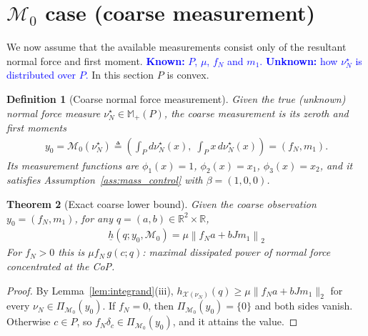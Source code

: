 \documentclass[11pt,a4paper]{article}
\theoremstyle{plain}
\newtheorem{theorem}{Theorem}[section]
\newtheorem{definition}[theorem]{Definition}
\newcommand{\X}{\mathcal X}
\begin{document}
\section{$\mathcal{M}_0$ case (coarse measurement)}
\label{sec:M0}

We now assume that the available measurements consist only of the resultant normal force and first moment.
\textcolor{blue}{\textbf{Known:} $P$, $\mu$, $f_N$ and $m_1$. \textbf{Unknown:} how $\nu_N^\star$ is distributed over $P$.}
In this section $P$ is convex. 

\begin{definition}[Coarse normal force measurement]\label{def:coarse_measurement}
    Given the true (unknown) normal force measure $\nu_N^\star\in\mathbb M_+(P)$,
    the coarse measurement is its zeroth and first moments
    \begin{align}
    y_0 = \mathcal M_0(\nu_N^\star) \triangleq \left(\int_P d\nu_N^\star(x),\;\int_P x\,d\nu_N^\star(x)\right) = (f_N,m_1).
    \end{align}
    Its measurement functions are $\phi_1(x)=1$, $\phi_2(x)=x_1$, $\phi_3(x)=x_2$, and it satisfies Assumption~\ref{ass:mass_control} with $\beta=(1,0,0)$.
\end{definition}

\begin{theorem}[Exact coarse lower bound]
\label{thm:coarse_lower}
    Given the coarse observation $y_0=(f_N,m_1)$, for any $q=(a,b)\in\mathbb R^2\times\mathbb R$,
    \begin{align}
            \boxed{\underline h(q;y_0,\mathcal M_0) = \mu \left\|f_Na+bJm_1\right\|_2}
    \end{align}
    For $f_N>0$ this is $\mu f_N\,g(c;q)$: maximal dissipated power of normal force concentrated at the CoP.
\end{theorem}
\begin{proof}
    By Lemma~\ref{lem:integrand}(iii), $h_{\X(\nu_N)}(q)\ge\mu\|f_Na+bJm_1\|_2$ for every $\nu_N\in\Pi_{\mathcal M_0}(y_0)$.
    If $f_N=0$, then $\Pi_{\mathcal M_0}(y_0)=\{0\}$ and both sides vanish. Otherwise $c\in P$, so $f_N\delta_c\in\Pi_{\mathcal M_0}(y_0)$, and it attains the value.
\end{proof}
\end{document}
